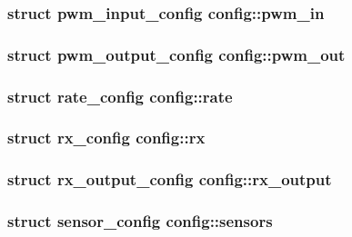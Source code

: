 \hypertarget{structconfig_ad7fd992c40bec664719fda7077e5c987}{
\subsubsection[{pwm\+\_\+in}]{\setlength{\rightskip}{0pt plus 5cm}struct {\bf pwm\+\_\+input\+\_\+config} config\+::pwm\+\_\+in}}\label{structconfig_ad7fd992c40bec664719fda7077e5c987}
\hypertarget{structconfig_a48eb314ca37d61eeaf60a970c0db241b}{
\subsubsection[{pwm\+\_\+out}]{\setlength{\rightskip}{0pt plus 5cm}struct {\bf pwm\+\_\+output\+\_\+config} config\+::pwm\+\_\+out}}\label{structconfig_a48eb314ca37d61eeaf60a970c0db241b}
\hypertarget{structconfig_a851b237249e46b47d800f3c9194eb828}{
\subsubsection[{rate}]{\setlength{\rightskip}{0pt plus 5cm}struct {\bf rate\+\_\+config} config\+::rate}}\label{structconfig_a851b237249e46b47d800f3c9194eb828}
\hypertarget{structconfig_a9acc824bd767f37ed6df002784444959}{
\subsubsection[{rx}]{\setlength{\rightskip}{0pt plus 5cm}struct {\bf rx\+\_\+config} config\+::rx}}\label{structconfig_a9acc824bd767f37ed6df002784444959}
\hypertarget{structconfig_ab292df855f721a708b06cbabf1959458}{
\subsubsection[{rx\+\_\+output}]{\setlength{\rightskip}{0pt plus 5cm}struct {\bf rx\+\_\+output\+\_\+config} config\+::rx\+\_\+output}}\label{structconfig_ab292df855f721a708b06cbabf1959458}
\hypertarget{structconfig_ab1c8394a951434b227ee85df71f49222}{
\subsubsection[{sensors}]{\setlength{\rightskip}{0pt plus 5cm}struct {\bf sensor\+\_\+config} config\+::sensors}}\label{structconfig_ab1c8394a951434b227ee85df71f49222}
